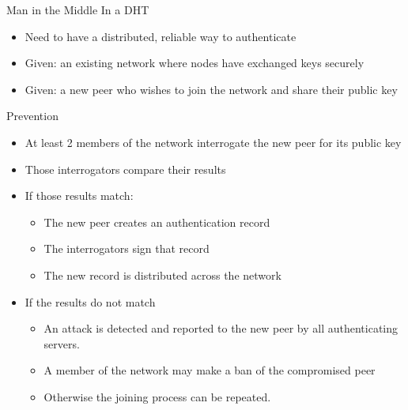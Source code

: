 \documentclass[11pt]{beamer}
\begin{document}
\begin{frame}{Man in the Middle In a DHT}

	\begin{itemize}
		\item Need to have a distributed, reliable way to authenticate 
		\item  Given: an existing network where nodes have exchanged keys securely
		\item  Given: a new peer who wishes to join the network and share their public key
	
	\end{itemize}


\end{frame}



\begin{frame}{Prevention}

	\begin{itemize}
		\item  At least 2 members of the network interrogate the new peer for its public key
		\item  Those interrogators compare their results
		\item  If those results match:
		\begin{itemize}
		
		    \item The new peer creates an authentication record
		    \item The interrogators sign that record
		    \item The new record is distributed across the network
		\end{itemize}
		
		
		\item  If the results do not match
		\begin{itemize}
		
		    \item An attack is detected and reported to the new peer by all authenticating servers.
		    \item A member of the network may make a ban of the compromised peer
		    \item Otherwise the joining process can be repeated.
		\end{itemize}
		
	\end{itemize}


\end{frame}
\end{document}
